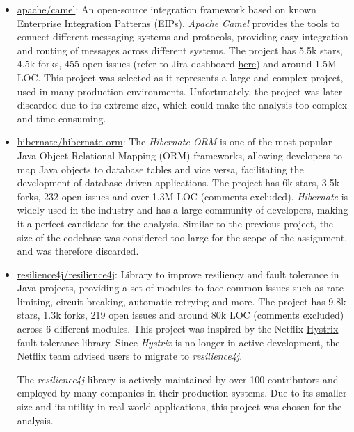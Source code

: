 \begin{itemize}
	\item \href{https://github.com/apache/camel}{apache/camel}: An open-source integration framework based on known Enterprise Integration Patterns (EIPs). \cite{camel:description} \textit{Apache Camel} provides the tools to connect different messaging systems and protocols, providing easy integration and routing of messages across different systems. The project has 5.5k stars, 4.5k forks, 455 open issues (refer to Jira dashboard \href{https://issues.apache.org/jira/projects/CAMEL/issues/CAMEL-21410?filter=allopenissues}{here}) and around 1.5M LOC. This project was selected as it represents a large and complex project, used in many production environments.
	      Unfortunately, the project was later discarded due to its extreme size, which could make the analysis too complex and time-consuming.

	\item \href{https://github.com/hibernate/hibernate-orm}{hibernate/hibernate-orm}: The \textit{Hibernate ORM} is one of the most popular Java Object-Relational Mapping (ORM) frameworks, allowing developers to map Java objects to database tables and vice versa, facilitating the development of database-driven applications. The project has 6k stars, 3.5k forks, 232 open issues and over 1.3M LOC (comments excluded). \textit{Hibernate} is widely used in the industry and has a large community of developers, making it a perfect candidate for the analysis.
	      Similar to the previous project, the size of the codebase was considered too large for the scope of the assignment, and was therefore discarded.

	\item \href{https://github.com/resilience4j/resilience4j}{resilience4j/resilience4j}: Library to improve resiliency and fault tolerance in Java projects, providing a set of modules to face common issues such as rate limiting, circuit breaking, automatic retrying and more. The project has 9.8k stars, 1.3k forks, 219 open issues and around 80k LOC (comments excluded) across 6 different modules. This project was inspired by the Netflix \href{https://github.com/Netflix/Hystrix}{Hystrix} fault-tolerance library. Since \textit{Hystrix} is no longer in active development, the Netflix team advised users to migrate to \textit{resilience4j}. \cite{hystrix:readme}

	      The \textit{resilience4j} library is actively maintained by over 100 contributors and employed by many companies in their production systems. Due to its smaller size and its utility in real-world applications, this project was chosen for the analysis.

\end{itemize}

